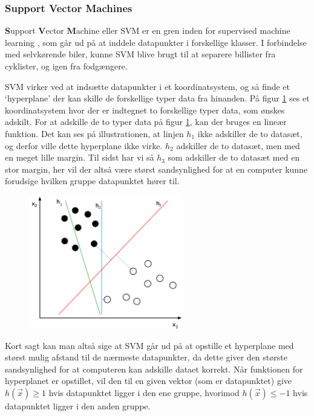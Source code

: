 \subsubsection{Support Vector Machines}
\textbf{S}upport \textbf{V}ector \textbf{M}achine eller SVM er en gren inden for supervised machine learning \cite{ML_BOOK}, som går ud på at inddele datapunkter i forskellige klasser. I forbindelse med selvkørende biler, kunne SVM blive brugt til at separere billister fra cyklister, og igen fra fodgængere.

SVM virker ved at indsætte datapunkter i et koordinatsystem, og så finde et `hyperplane' der kan skille de forskellige typer data fra hinanden. På figur \ref{fig:SVM} ses et koordinatsystem hvor der er indtegnet to forskellige typer data, som ønskes adskilt. For at adskille de to typer data på figur \ref{fig:SVM}, kan der bruges en lineær funktion. Det kan ses på illustrationen, at linjen $h_1$ ikke adskiller de to datasæt, og derfor ville dette hyperplane ikke virke. $h_2$ adskiller de to datasæt, men med en meget lille margin. Til sidst har vi så $h_3$ som adskiller de to datasæt med en stor margin, her vil der altså være størst sandsynlighed for at en computer kunne forudsige hvilken gruppe datapunktet hører til. 
\begin{figure}[h!]
	\centering
	\includegraphics[width=0.6\textwidth]{images/SVM.png}
	\label{fig:SVM}
\end{figure}

Kort sagt kan man altså sige at SVM går ud på at opstille et hyperplane med størst mulig afstand til de nærmeste datapunkter, da dette giver den største sandsynlighed for at computeren kan adskille dataet korrekt.
Når funktionen for hyperplanet er opstillet, vil den til en given vektor (som er datapunktet) give $h(\vec{x}) \geq 1$ hvis datapunktet ligger i den ene gruppe, hvorimod $h(\vec{x}) \leq -1$ hvis datapunktet ligger i den anden gruppe. 